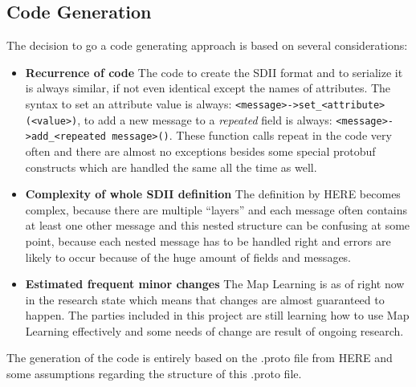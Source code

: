 \subsection{Code Generation}
\label{mfl_generation}
The decision to go a code generating approach is based on several considerations:
\begin{itemize}
\item \textbf{Recurrence of code} The code to create the SDII format and to serialize it is always similar, if not even identical except the names of attributes. The syntax to set an attribute value is always: \verb|<message>->set_<attribute>(<value>)|, to add a new message to a \emph{repeated} field is always: \verb|<message>->add_<repeated message>()|. These function calls repeat in the code very often and there are almost no exceptions besides some special protobuf constructs which are handled the same all the time as well.
\item \textbf{Complexity of whole SDII definition} The definition by HERE becomes complex, because there are multiple \enquote{layers} and each message often contains at least one other message and this nested structure can be confusing at some point, because each nested message has to be handled right and errors are likely to occur because of the huge amount of fields and messages.
\item \textbf{Estimated frequent minor changes} The Map Learning is as of right now in the research state which means that changes are almost guaranteed to happen. The parties included in this project are still learning how to use Map Learning effectively and some needs of change are result of ongoing research.
\end{itemize}
The generation of the code is entirely based on the .proto file from HERE and some assumptions regarding the structure of this .proto file.
